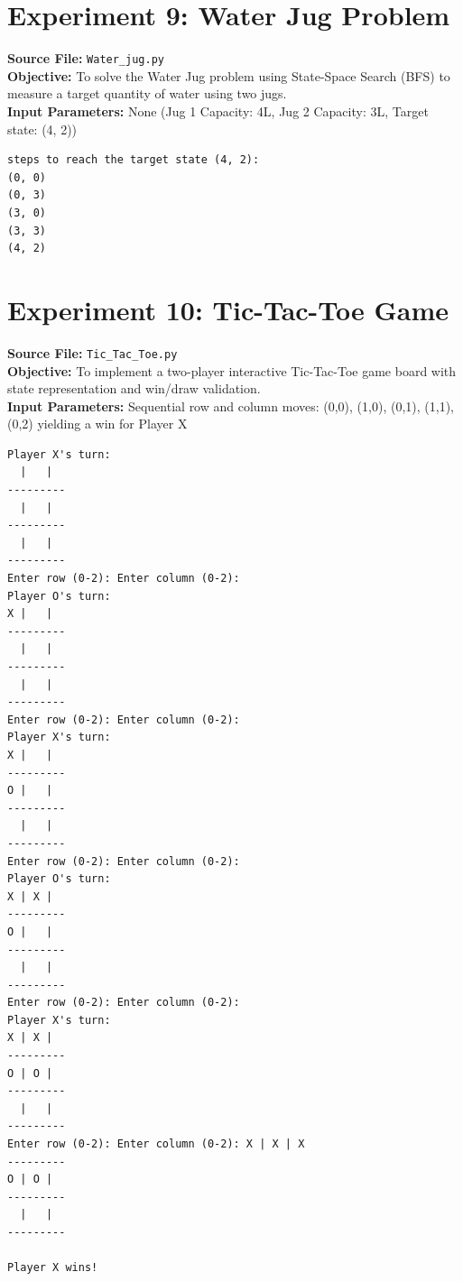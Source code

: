 \documentclass[11pt,a4paper]{article}
\begin{document}
\section{Experiment 9: Water Jug Problem}
\textbf{Source File:} \texttt{Water_jug.py} \\[4pt]
\textbf{Objective:} To solve the Water Jug problem using State-Space Search (BFS) to measure a target quantity of water using two jugs. \\[4pt]
\textbf{Input Parameters:} None (Jug 1 Capacity: 4L, Jug 2 Capacity: 3L, Target state: (4, 2)) \\[6pt]
\begin{tcolorbox}[colback=gray!5!white,colframe=blue!70!black,title={\textbf{Program Output: Water Jug Problem}}]
\begin{verbatim}
steps to reach the target state (4, 2):
(0, 0)
(0, 3)
(3, 0)
(3, 3)
(4, 2)
\end{verbatim}
\end{tcolorbox}
\vspace{1em}

\section{Experiment 10: Tic-Tac-Toe Game}
\textbf{Source File:} \texttt{Tic_Tac_Toe.py} \\[4pt]
\textbf{Objective:} To implement a two-player interactive Tic-Tac-Toe game board with state representation and win/draw validation. \\[4pt]
\textbf{Input Parameters:} Sequential row and column moves: (0,0), (1,0), (0,1), (1,1), (0,2) yielding a win for Player X \\[6pt]
\begin{tcolorbox}[colback=gray!5!white,colframe=blue!70!black,title={\textbf{Program Output: Tic-Tac-Toe Game}}]
\begin{verbatim}
Player X's turn:
  |   |  
---------
  |   |  
---------
  |   |  
---------
Enter row (0-2): Enter column (0-2): 
Player O's turn:
X |   |  
---------
  |   |  
---------
  |   |  
---------
Enter row (0-2): Enter column (0-2): 
Player X's turn:
X |   |  
---------
O |   |  
---------
  |   |  
---------
Enter row (0-2): Enter column (0-2): 
Player O's turn:
X | X |  
---------
O |   |  
---------
  |   |  
---------
Enter row (0-2): Enter column (0-2): 
Player X's turn:
X | X |  
---------
O | O |  
---------
  |   |  
---------
Enter row (0-2): Enter column (0-2): X | X | X
---------
O | O |  
---------
  |   |  
---------

Player X wins!
\end{verbatim}
\end{tcolorbox}
\vspace{1em}
\end{document}

